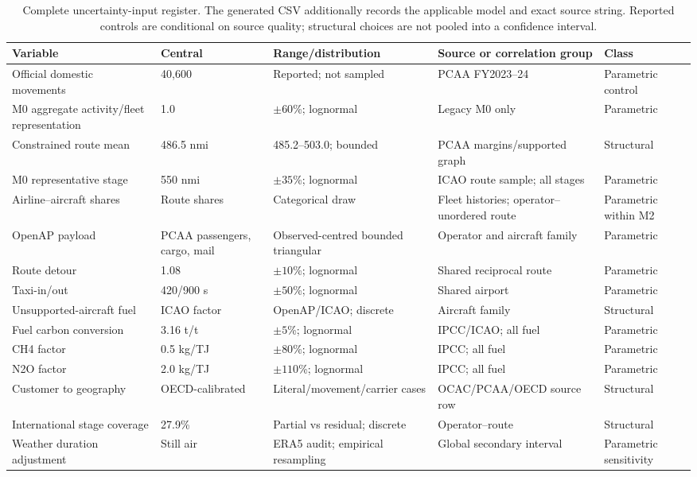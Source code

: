 \begin{table}[htbp]
\centering
\scriptsize
\begin{tabular}{@{}p{}p{}p{}p{}p{}@{}}
\toprule
\textbf{Variable} & \textbf{Central} & \textbf{Range/distribution} & \textbf{Source or correlation group} & \textbf{Class} \\
\midrule
Official domestic movements & 40,600 & Reported; not sampled & PCAA FY2023--24 & Parametric control \\
M0 aggregate activity/fleet representation & 1.0 & $\pm60$\%; lognormal & Legacy M0 only & Parametric \\
Constrained route mean & 486.5 nmi & 485.2--503.0; bounded & PCAA margins/supported graph & Structural \\
M0 representative stage & 550 nmi & $\pm35$\%; lognormal & ICAO route sample; all stages & Parametric \\
Airline--aircraft shares & Route shares & Categorical draw & Fleet histories; operator--unordered route & Parametric within M2 \\
OpenAP payload & PCAA passengers, cargo, mail & Observed-centred bounded triangular & Operator and aircraft family & Parametric \\
Route detour & 1.08 & $\pm10$\%; lognormal & Shared reciprocal route & Parametric \\
Taxi-in/out & 420/900 s & $\pm50$\%; lognormal & Shared airport & Parametric \\
Unsupported-aircraft fuel & ICAO factor & OpenAP/ICAO; discrete & Aircraft family & Structural \\
Fuel carbon conversion & 3.16 t/t & $\pm5$\%; lognormal & IPCC/ICAO; all fuel & Parametric \\
CH4 factor & 0.5 kg/TJ & $\pm80$\%; lognormal & IPCC; all fuel & Parametric \\
N2O factor & 2.0 kg/TJ & $\pm110$\%; lognormal & IPCC; all fuel & Parametric \\
Customer to geography & OECD-calibrated & Literal/movement/carrier cases & OCAC/PCAA/OECD source row & Structural \\
International stage coverage & 27.9\% & Partial vs residual; discrete & Operator--route & Structural \\
Weather duration adjustment & Still air & ERA5 audit; empirical resampling & Global secondary interval & Parametric sensitivity \\
\bottomrule
\end{tabular}
\caption{Complete uncertainty-input register. The generated CSV additionally records the
applicable model and exact source string. Reported controls are conditional on source quality;
structural choices are not pooled into a confidence interval.}
\label{tab:uncertainty-register}
\end{table}

